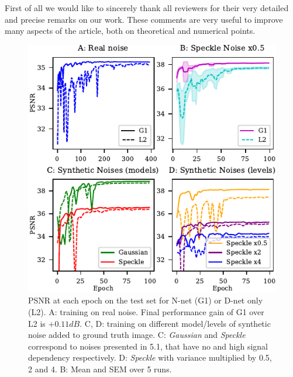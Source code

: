 \documentclass{article}
\begin{document}

First of all we would like to sincerely thank all reviewers for their very detailed and precise remarks on our work. These comments are very useful to improve many aspects of the article, both on theoretical and numerical points.
\begin{figure}[H]
\vskip -0.1in
\begin{center}
\includegraphics[width=\columnwidth]{fig_review.pdf}
\vskip -0.15in
\caption{PSNR at each epoch on the test set for N-net (G1) or D-net only (L2). A: training on real noise. Final performance gain of G1 over L2 is $+0.11dB$. C, D: training on different model/levels of synthetic noise added to ground truth image. C: \textit{Gaussian} and \textit{Speckle} correspond to noises presented in 5.1, that have no and high signal dependency respectively. D: \textit{Speckle} with variance multiplied by 0.5, 2 and 4. B: Mean and SEM over 5 runs.}
\label{fig:review}
\end{center}
\vskip -0.25in
\end{figure}
\end{document}
